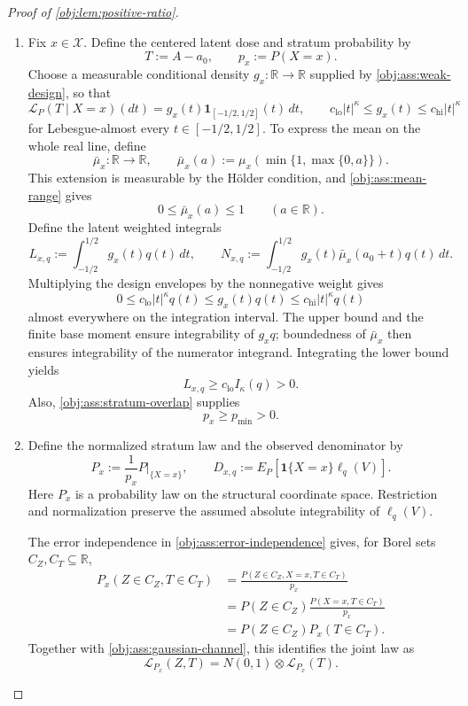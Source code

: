 \documentclass[11pt]{article}
\begin{document}
\begin{proof}[Proof of \cref{obj:lem:positive-ratio}]
\begin{enumerate}
\item Fix \(x\in\mathcal X\). Define the centered latent dose and stratum probability by
\[
T:=A-a_0,\qquad p_x:=P(X=x).
\]
Choose a measurable conditional density \(g_x:\mathbb R\to\mathbb R\) supplied by \cref{obj:ass:weak-design}, so that
\[
\mathcal L_P(T\mid X=x)(dt)
=
g_x(t)\mathbf1_{[-1/2,1/2]}(t)\,dt,
\qquad
c_{\mathrm{lo}}|t|^\kappa\le g_x(t)\le c_{\mathrm{hi}}|t|^\kappa
\]
for Lebesgue-almost every \(t\in[-1/2,1/2]\). To express the mean on the whole real line, define
\[
\bar\mu_x:\mathbb R\to\mathbb R,
\qquad
\bar\mu_x(a):=\mu_x\!\left(\min\{1,\max\{0,a\}\}\right).
\]
This extension is measurable by the Hölder condition, and \cref{obj:ass:mean-range} gives
\[
0\le\bar\mu_x(a)\le1\qquad(a\in\mathbb R).
\]
Define the latent weighted integrals
\[
L_{x,q}:=\int_{-1/2}^{1/2}g_x(t)q(t)\,dt,
\qquad
N_{x,q}:=\int_{-1/2}^{1/2}
g_x(t)\bar\mu_x(a_0+t)q(t)\,dt.
\]
Multiplying the design envelopes by the nonnegative weight gives
\[
0\le c_{\mathrm{lo}}|t|^\kappa q(t)
\le g_x(t)q(t)
\le c_{\mathrm{hi}}|t|^\kappa q(t)
\]
almost everywhere on the integration interval. The upper bound and the finite base moment ensure integrability of \(g_xq\); boundedness of \(\bar\mu_x\) then ensures integrability of the numerator integrand. Integrating the lower bound yields
\[
L_{x,q}\ge c_{\mathrm{lo}} I_\kappa(q)>0.
\]
Also, \cref{obj:ass:stratum-overlap} supplies
\[
p_x\ge p_{\min}>0.
\]

\item Define the normalized stratum law and the observed denominator by
\[
P_x:=\frac{1}{p_x}P|_{\{X=x\}},
\qquad
D_{x,q}:=E_P[\mathbf1\{X=x\}\ell_q(V)].
\]
Here \(P_x\) is a probability law on the structural coordinate space. Restriction and normalization preserve the assumed absolute integrability of \(\ell_q(V)\).

The error independence in \cref{obj:ass:error-independence} gives, for Borel sets \(C_Z,C_T\subseteq\mathbb R\),
\[
\begin{aligned}
P_x(Z\in C_Z,T\in C_T)
&=\frac{P(Z\in C_Z,X=x,T\in C_T)}{p_x}\\
&=P(Z\in C_Z)\frac{P(X=x,T\in C_T)}{p_x}\\
&=P(Z\in C_Z)P_x(T\in C_T).
\end{aligned}
\]
Together with \cref{obj:ass:gaussian-channel}, this identifies the joint law as
\[
\mathcal L_{P_x}(Z,T)
=
N(0,1)\otimes\mathcal L_{P_x}(T).
\]


\end{enumerate}
\end{proof}
\end{document}
